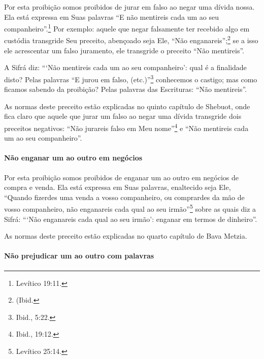 \begin{multicols}{2}
Por esta proibição somos proibidos de jurar em falso ao negar uma dívida
nossa. Ela está expressa em Suas palavras ``E não mentireis cada um ao
seu companheiro''.\footnote{Levítico 19:11.} Por exemplo: aquele que negar
falsamente ter recebido algo em custódia transgride Seu preceito,
abençoado seja Ele, ``Não enganareis'';\footnote{(Ibid.} se a isso ele
acrescentar um falso juramento, ele transgride o preceito ``Não
mentireis''.

A Sifrá\starr{} diz: ```Não mentireis cada um ao seu companheiro': qual é a
finalidade disto? Pelas palavras ``E jurou em falso, (etc.)''\footnote{Ibid.,
5:22.} conhecemos o castigo; mas como ficamos sabendo da proibição? Pelas
palavras das Escrituras: ``Não mentireis''.

As normas deste preceito estão explicadas no quinto capítulo de
Shebuot\starr, onde fica claro que aquele que jurar um falso ao negar uma
dívida transgride dois preceitos negativos: ``Não jurareis falso em Meu
nome''\footnote{Ibid., 19:12.} e ``Não mentireis cada um ao seu companheiro''.

\paragraph{Não enganar um ao outro em negócios}

Por esta proibição somos proibidos de enganar um ao outro em negócios
de compra e venda. Ela está expressa em Suas palavras, enaltecido seja
Ele, ``Quando fizerdes uma venda a vosso companheiro, ou comprardes da
mão de vosso companheiro, não enganareis cada qual ao seu irmão''\footnote{Levítico
25:14.} sobre as quais diz a Sifrá\starr: ```Não enganareis cada qual ao seu
irmão': enganar em termos de dinheiro''.

As normas deste preceito estão explicadas no quarto capítulo de Bava Metzia\starr.

\paragraph{Não prejudicar um ao outro com palavras}


\end{multicols}
